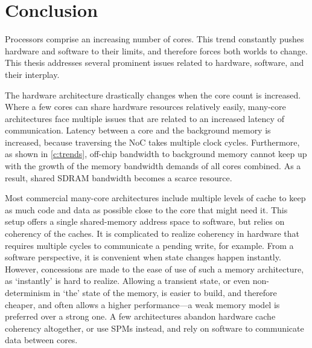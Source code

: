 \chapter{Conclusion}
\label{c:conclusion}


Processors comprise an increasing number of cores.
This trend constantly pushes hardware and software to their limits, and therefore forces both worlds to change.
This thesis addresses several prominent issues related to hardware, software, and their interplay.

The hardware architecture drastically changes when the core count is increased.
Where a few cores can share hardware resources relatively easily, many-core architectures face multiple issues that are related to an increased latency of communication.
Latency between a core and the background memory is increased, because traversing the \ac{NoC} takes multiple clock cycles.
Furthermore, as shown in \cref{c:trends}, off-chip bandwidth to background memory cannot keep up with the growth of the memory bandwidth demands of all cores combined.
As a result, shared \ac{SDRAM} bandwidth becomes a scarce resource.

Most commercial many-core architectures include multiple levels of cache to keep as much code and data as possible close to the core that might need it.
This setup offers a single shared-memory address space to software, but relies on coherency of the caches.
It is complicated to realize coherency in hardware that requires multiple cycles to communicate a pending write, for example.
From a software perspective, it is convenient when state changes happen instantly.
However, concessions are made to the ease of use of such a memory architecture, as `instantly' is hard to realize.
Allowing a transient state, or even non-determinism in `the' state of the memory, is easier to build, and therefore cheaper, and often allows a higher performance---a weak memory model is preferred over a strong one.
A few architectures abandon hardware cache coherency altogether, or use \aclp{SPM} instead, and rely on software to communicate data between cores.

